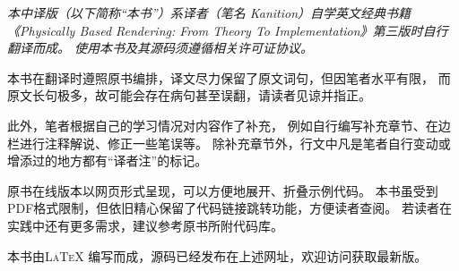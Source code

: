 {\itshape
本中译版（以下简称“本书”）系译者（笔名 Kanition）自学英文经典书籍
《Physically Based Rendering: From Theory To Implementation》第三版时自行翻译而成。
使用本书及其源码须遵循相关许可证协议。

本书在翻译时遵照原书编排，译文尽力保留了原文词句，但因笔者水平有限，
而原文长句极多，故可能会存在病句甚至误翻，请读者见谅并指正。

此外，笔者根据自己的学习情况对内容作了补充，
例如自行编写补充章节、在边栏进行注释解说、修正一些笔误等。
除补充章节外，行文中凡是笔者自行变动或增添过的地方都有“译者注”的标记。

原书在线版本以网页形式呈现，可以方便地展开、折叠示例代码。
本书虽受到PDF格式限制，但依旧精心保留了代码链接跳转功能，方便读者查阅。
若读者在实践中还有更多需求，建议参考原书所附代码库。

本书由{\scshape \LaTeX} 编写而成，源码已经发布在上述网址，欢迎访问获取最新版。

{\color{red}}
}